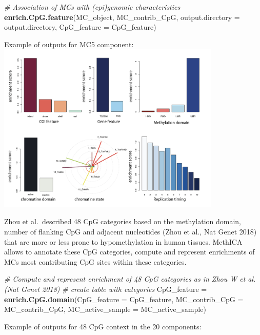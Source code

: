 \documentclass[]{article}
\newenvironment{Shaded}{\begin{snugshade}}{\end{snugshade}}
\newcommand{\CommentTok}[1]{\textcolor[rgb]{0.56,0.35,0.01}{\textit{#1}}}
\newcommand{\DataTypeTok}[1]{\textcolor[rgb]{0.13,0.29,0.53}{#1}}
\newcommand{\KeywordTok}[1]{\textcolor[rgb]{0.13,0.29,0.53}{\textbf{#1}}}
\newcommand{\NormalTok}[1]{#1}
\newcommand{\StringTok}[1]{\textcolor[rgb]{0.31,0.60,0.02}{#1}}
\begin{document}
\begin{Shaded}
\begin{Highlighting}[]
\CommentTok{# Association of MCs with (epi)genomic characteristics}
\KeywordTok{enrich.CpG.feature}\NormalTok{(MC_object, MC_contrib_CpG, }\DataTypeTok{output.directory =}\NormalTok{ output.directory, }\DataTypeTok{CpG_feature =}\NormalTok{ CpG_feature)}
\end{Highlighting}
\end{Shaded}

Example of outputs for MC5 component:
\includegraphics[width=0.8\textwidth,height=0.8\textheight]{./CpG_feature.png}

Zhou et al.~described 48 CpG categories based on the methylation domain,
number of flanking CpG and adjacent nucleotides (Zhou et al., Nat Genet
2018) that are more or less prone to hypomethylation in human tissues.
MethICA allows to annotate these CpG categories, compute and represent
enrichments of MCs most contributing CpG sites within these categories.

\begin{Shaded}
\begin{Highlighting}[]
\CommentTok{# Compute and represent enrichment of 48 CpG categories as in Zhou W et al. (Nat Genet 2018)}
\CommentTok{# create table with categories}
\NormalTok{CpG_feature =}\StringTok{ }\KeywordTok{enrich.CpG.domain}\NormalTok{(}\DataTypeTok{CpG_feature =}\NormalTok{ CpG_feature, }\DataTypeTok{MC_contrib_CpG =}\NormalTok{ MC_contrib_CpG, }\DataTypeTok{MC_active_sample =}\NormalTok{ MC_active_sample)}
\end{Highlighting}
\end{Shaded}

Example of outputs for 48 CpG context in the 20 components:
\end{document}
